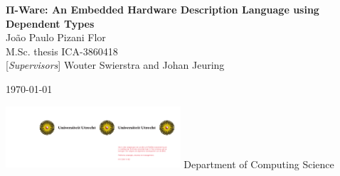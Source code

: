 

\begin{titlepage}

    \HRule
    \begin{flushright}
        \Huge \textbf{Π-Ware: An Embedded Hardware Description Language using Dependent Types}\\[10.0pt]%
        \LARGE João Paulo Pizani Flor\\[1.5pt]%
        \vfill
        \large M.Sc. thesis
        ICA-3860418\\
        \large {[}\emph{Supervisors}{]} Wouter Swierstra and Johan Jeuring \\[7mm]
    \end{flushright}
    \begin{center}%
        \today%
    \end{center}%
    \vskip -3mm
    \HRule
    \vfill
    \hfill \includegraphics[width=6.5cm]{imgs/uusol-links.pdf}
    \vskip 3mm
    \hfill {\large Department of Computing Science}
\end{titlepage}

\clearpage


\restoregeometry
